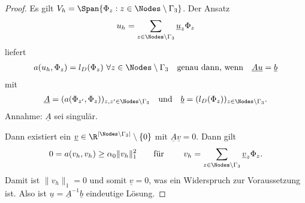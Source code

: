 \begin{proof}
    Es gilt $V_h = \Span\{\Phi_z: z\in\Nodes \setminus \Gamma_3\}$.
    Der Ansatz
    \begin{eqnarray*}
        u_h = \sum_{z\in\Nodes \setminus \Gamma_3} \underline u_z \Phi_z
    \end{eqnarray*}
    liefert
    \begin{eqnarray*}
        a(u_h, \Phi_z) = l_D(\Phi_z) \ \forall z\in \Nodes \setminus
        \Gamma_3
        \quad \text{genau dann, wenn} \quad
        \underline A \underline u = \underline b
    \end{eqnarray*}
    mit
    \begin{eqnarray*}
        \underline A = (a(\Phi_{z^\prime}, \Phi_z))_{z,z^\prime\in \Nodes
        \setminus \Gamma_3}
        \quad \text{und} \quad \underline b = (l_D(\Phi_z))
        _{z\in \Nodes \setminus \Gamma_3}.
    \end{eqnarray*}
    Annahme: $\underline A$ sei singulär.
    
    Dann existiert ein $\underline v\in \R^{|\Nodes \setminus \Gamma_3|}
    \setminus \{0\}$ mit $\underline A \underline v = 0$. Dann gilt
    \begin{eqnarray*}
        0 = a(v_h, v_h) \ge \alpha_0 \|v_h\|_1^2
        \qquad \text{für } \qquad
        v_h = \sum_{z\in\Nodes \setminus \Gamma_3} \underline v_z \Phi_z.
    \end{eqnarray*}
    Damit ist $\|v_h\|_1 = 0$ und somit $\underline v = 0$, was ein Widerspruch
    zur Voraussetzung ist.
    Also ist $\underline u = \underline A^{-1} \underline b$ eindeutige
    Lösung.
\end{proof}


